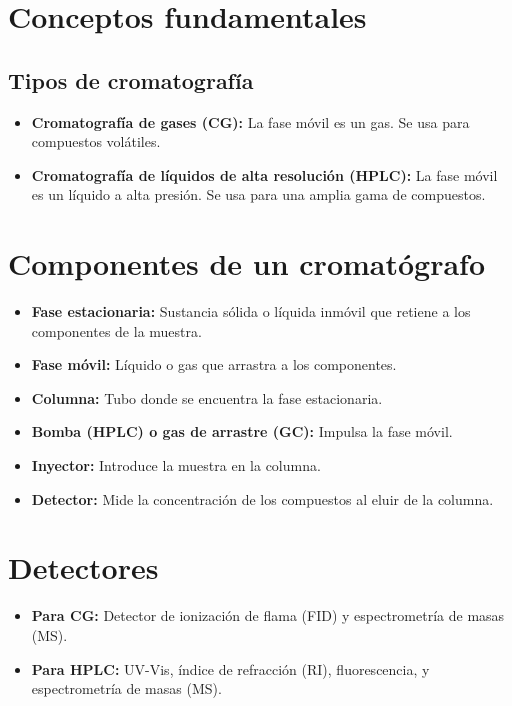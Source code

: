 \section{Conceptos fundamentales}


\subsection{Tipos de cromatografía}

\begin{itemize}
    \item \textbf{Cromatografía de gases (CG):} La fase móvil es un gas. Se usa para compuestos volátiles.
    \item \textbf{Cromatografía de líquidos de alta resolución (HPLC):} La fase móvil es un líquido a alta presión. Se usa para una amplia gama de compuestos.
\end{itemize}

\section{Componentes de un cromatógrafo}

\begin{itemize}
    \item \textbf{Fase estacionaria:} Sustancia sólida o líquida inmóvil que retiene a los componentes de la muestra.
    \item \textbf{Fase móvil:} Líquido o gas que arrastra a los componentes.
    \item \textbf{Columna:} Tubo donde se encuentra la fase estacionaria.
    \item \textbf{Bomba (HPLC) o gas de arrastre (GC):} Impulsa la fase móvil.
    \item \textbf{Inyector:} Introduce la muestra en la columna.
    \item \textbf{Detector:} Mide la concentración de los compuestos al eluir de la columna.
\end{itemize}

\section{Detectores}
\begin{itemize}
    \item \textbf{Para CG:} Detector de ionización de flama (FID) y espectrometría de masas (MS).
    \item \textbf{Para HPLC:} UV-Vis, índice de refracción (RI), fluorescencia, y espectrometría de masas (MS).
\end{itemize}

